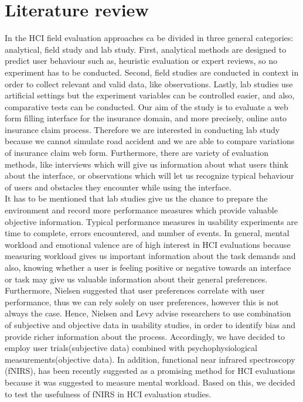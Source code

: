 \documentclass[a4paper]{report}
\begin{document}
\chapter{Literature review}
	In the HCI field  evaluation approaches ca be divided in three general categories: analytical, field study and lab study\cite{rogers2007interaction}. First, analytical methods are designed to predict user behaviour such as, heuristic evaluation or expert reviews, so no experiment has to be conducted. Second, field studies are conducted in context in order to collect relevant and valid data, like observations. Lastly, lab studies use artificial settings but the experiment variables can be controlled easier, and also, comparative tests can be conducted. Our aim of the study is to evaluate a web form filling interface for the insurance domain, and more precisely, online auto insurance claim process. Therefore we are interested in conducting lab study because we cannot simulate road accident and we are able to compare variations of insurance claim web form. Furthermore, there are variety of evaluation methods, like interviews which will give us information about what users think about the interface, or observations which will let us recognize typical behaviour of users and obstacles they encounter while using the interface.\\
	
	It has to be mentioned that lab studies give us the chance to prepare the environment and record more performance measures which provide valuable objective information. Typical performance measures in usability experiments are time to complete, errors encountered, and number of events. In general, mental workload and emotional valence are of high interest in HCI evaluations because measuring workload gives us important information about the task demands and also, knowing whether a user is feeling positive or negative towards an interface or task may give us valuable information about their general preferences. Furthermore, Nielsen\cite{nielsen1994measuring} suggested that user preferences correlate with user performance, thus we can rely solely on user preferences, however this is not always the case. Hence, Nielsen and Levy \cite{nielsen1994measuring} advise researchers to use combination of subjective and objective data in usability studies, in order to identify bias and provide richer information about the process. Accordingly, we have decided to employ user trials(subjective data) combined with psychophysiological measurements(objective data). In addition, functional near infrared spectroscopy (fNIRS), has been recently suggested as a promising method for HCI evaluations\cite{maior2015examining,pike2014measuring} because it was suggested to measure mental workload\cite{maior2014continuous}. Based on this, we decided to test the usefulness of fNIRS in HCI evaluation studies. \\
	
\end{document}
